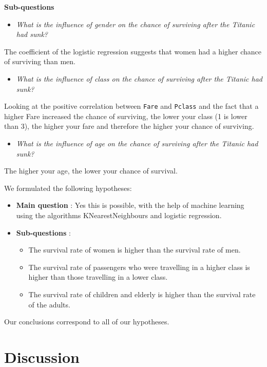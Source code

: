 \documentclass[11pt]{article}
\begin{document}
\textbf{Sub-questions} 

\begin{itemize}
\item \emph{What is the influence of gender on the chance of surviving after the Titanic had sunk?}
\end{itemize}
The coefficient of the logistic regression suggests that women had a higher chance of surviving than men. 


\begin{itemize}
\item \emph{What is the influence of class on the chance of surviving after the Titanic had sunk?}
\end{itemize}
Looking at the positive correlation between \texttt{Fare} and \texttt{Pclass} and the fact that a higher Fare increased the chance of surviving, the lower your class (1 is lower than 3),  the higher your fare and therefore the higher your chance of surviving. 

\begin{itemize}
\item \emph{What is the influence of age on the chance of surviving after the Titanic had sunk?}
\end{itemize}
The higher your age, the lower your chance of survival. 

We formulated the following hypotheses: 

\begin{itemize}
\item \textbf{Main question} : Yes this is possible, with the help of machine learning using the algorithms KNearestNeighbours and logistic regression.
\item \textbf{Sub-questions} :

\begin{itemize}
\item The survival rate of women is higher than the survival rate of men.
\item The survival rate of passengers who were travelling in a higher class is higher than those travelling in a lower class.
\item The survival rate of children and elderly is higher than the survival rate of the adults.
\end{itemize}
\end{itemize}

Our conclusions correspond to all of our hypotheses. 

\newpage
\section{Discussion}
\label{sec:org9a53525}
\label{sec:discussion}
\end{document}
